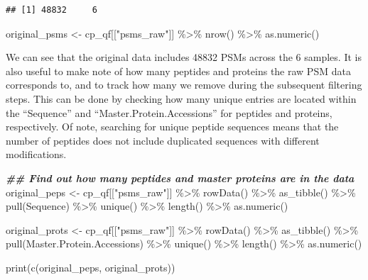\documentclass[9pt,a4paper,]{extarticle}
\newenvironment{Shaded}{\begin{snugshade}}{\end{snugshade}}
\newcommand{\DocumentationTok}[1]{\textcolor[rgb]{0.56,0.35,0.01}{\textbf{\textit{#1}}}}
\newcommand{\FunctionTok}[1]{\textcolor[rgb]{0.00,0.00,0.00}{#1}}
\newcommand{\NormalTok}[1]{#1}
\newcommand{\OtherTok}[1]{\textcolor[rgb]{0.56,0.35,0.01}{#1}}
\newcommand{\SpecialCharTok}[1]{\textcolor[rgb]{0.00,0.00,0.00}{#1}}
\newcommand{\StringTok}[1]{\textcolor[rgb]{0.31,0.60,0.02}{#1}}
\begin{document}
\begin{verbatim}
## [1] 48832     6
\end{verbatim}

\begin{Shaded}
\begin{Highlighting}[]
\NormalTok{original\_psms }\OtherTok{\textless{}{-}}\NormalTok{ cp\_qf[[}\StringTok{"psms\_raw"}\NormalTok{]] }\SpecialCharTok{\%\textgreater{}\%}
  \FunctionTok{nrow}\NormalTok{() }\SpecialCharTok{\%\textgreater{}\%}
  \FunctionTok{as.numeric}\NormalTok{()}
\end{Highlighting}
\end{Shaded}

We can see that the original data includes 48832 PSMs
across the 6 samples. It is also useful to make note of how many peptides and
proteins the raw PSM data corresponds to, and to track how many we remove during
the subsequent filtering steps. This can be done by checking how many unique entries
are located within the ``Sequence'' and ``Master.Protein.Accessions'' for peptides
and proteins, respectively. Of note, searching for unique peptide sequences means
that the number of peptides does not include duplicated sequences with different
modifications.

\begin{Shaded}
\begin{Highlighting}[]
\DocumentationTok{\#\# Find out how many peptides and master proteins are in the data}
\NormalTok{original\_peps }\OtherTok{\textless{}{-}}\NormalTok{ cp\_qf[[}\StringTok{"psms\_raw"}\NormalTok{]] }\SpecialCharTok{\%\textgreater{}\%} 
  \FunctionTok{rowData}\NormalTok{() }\SpecialCharTok{\%\textgreater{}\%} 
  \FunctionTok{as\_tibble}\NormalTok{() }\SpecialCharTok{\%\textgreater{}\%} 
  \FunctionTok{pull}\NormalTok{(Sequence) }\SpecialCharTok{\%\textgreater{}\%} 
  \FunctionTok{unique}\NormalTok{() }\SpecialCharTok{\%\textgreater{}\%}
  \FunctionTok{length}\NormalTok{() }\SpecialCharTok{\%\textgreater{}\%}
  \FunctionTok{as.numeric}\NormalTok{()}

\NormalTok{original\_prots }\OtherTok{\textless{}{-}}\NormalTok{ cp\_qf[[}\StringTok{"psms\_raw"}\NormalTok{]] }\SpecialCharTok{\%\textgreater{}\%} 
  \FunctionTok{rowData}\NormalTok{() }\SpecialCharTok{\%\textgreater{}\%} 
  \FunctionTok{as\_tibble}\NormalTok{() }\SpecialCharTok{\%\textgreater{}\%} 
  \FunctionTok{pull}\NormalTok{(Master.Protein.Accessions) }\SpecialCharTok{\%\textgreater{}\%} 
  \FunctionTok{unique}\NormalTok{() }\SpecialCharTok{\%\textgreater{}\%}
  \FunctionTok{length}\NormalTok{() }\SpecialCharTok{\%\textgreater{}\%}
  \FunctionTok{as.numeric}\NormalTok{()}

\FunctionTok{print}\NormalTok{(}\FunctionTok{c}\NormalTok{(original\_peps, original\_prots))}
\end{Highlighting}
\end{Shaded}
\end{document}
